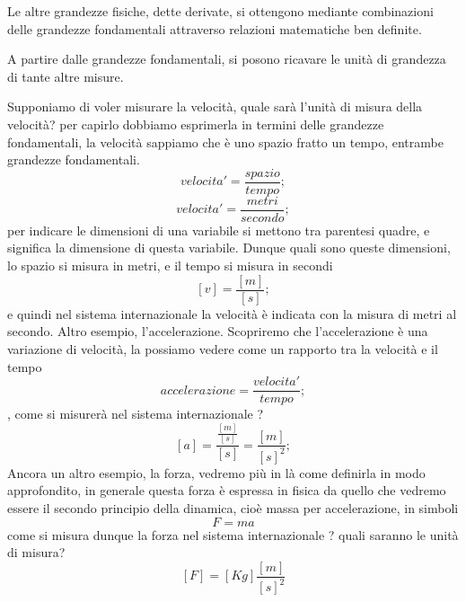 \documentclass[a4paper,12pt]{article}
\theoremstyle{plain}
\theoremstyle{definition}
\theoremstyle{remark}
\begin{document}
Le altre grandezze fisiche, dette derivate, si ottengono mediante combinazioni delle grandezze fondamentali attraverso relazioni matematiche ben definite.

A partire dalle grandezze fondamentali, si posono ricavare le unità di grandezza di tante altre misure.

Supponiamo di voler misurare la velocità, quale sarà l'unità di misura della velocità? per capirlo dobbiamo esprimerla in termini delle grandezze fondamentali, la velocità sappiamo che è uno spazio fratto un tempo, entrambe grandezze fondamentali. 
\[velocita' = \dfrac{spazio}{tempo};\]
\[velocita' = \dfrac{metri}{secondo};\]
per indicare le dimensioni di una variabile si mettono tra parentesi quadre, e significa la dimensione di questa variabile.
Dunque quali sono queste dimensioni, lo spazio si misura in metri, e il tempo si misura in secondi
\[[v] = \dfrac{[m]}{[s]};\]
e quindi nel sistema internazionale la velocità è indicata con la misura di metri al secondo.
Altro esempio, l'accelerazione. Scopriremo che l'accelerazione è una variazione di velocità, 
la possiamo vedere come un rapporto tra la velocità e il tempo
\[accelerazione = \dfrac{velocita'}{tempo};\]
, come si misurerà nel sistema internazionale ?
\[[a] = \dfrac{\frac{[m]}{[s]}}{[s]}= \dfrac{[m]}{[s]^2};\]
Ancora un altro esempio, la forza, vedremo più in là come definirla in modo approfondito, in generale questa forza 
è espressa in fisica da quello che vedremo essere il secondo principio della dinamica, 
cioè massa per accelerazione, in simboli
\[F=ma\]
come si misura dunque la forza nel sistema internazionale ? quali saranno le unità di misura? 
\[[F]=[Kg]\dfrac{[m]}{[s]^2}\]
\end{document}
